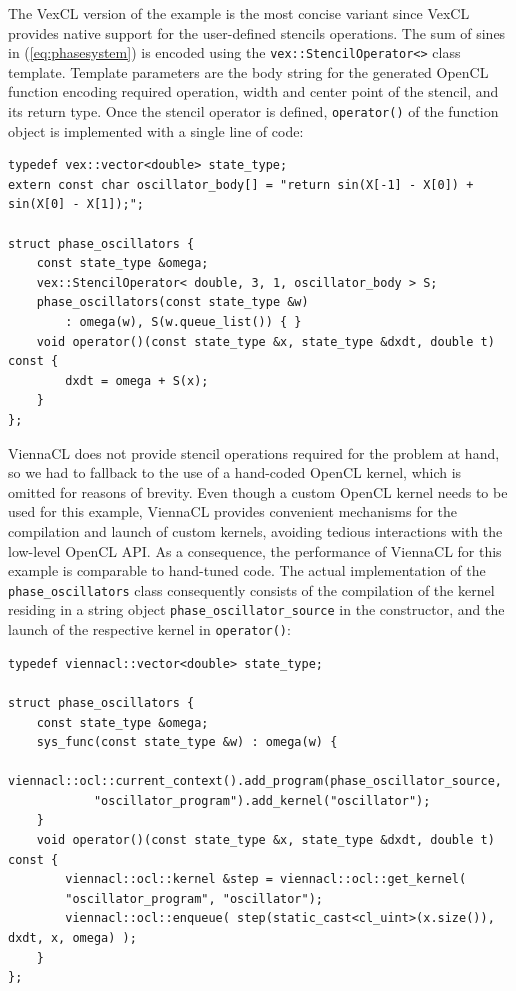 \documentclass[final]{siamltex}
\newcommand{\code}[1]{\lstinline|#1|}
\newcommand{\eqref}[1]{(\ref{#1})}
\begin{document}
The VexCL version of the example is the most
concise variant since VexCL provides native support for the user-defined
stencils operations. The sum of sines in \eqref{eq:phasesystem} is encoded
using the \code{vex::StencilOperator<>} class template. Template parameters
are the body string for the generated OpenCL function encoding required
operation, width and center point of the stencil, and its return type. Once the
stencil operator is defined, \code{operator()} of the function object is implemented
with a single line of code:
\begin{lstlisting}
typedef vex::vector<double> state_type;
extern const char oscillator_body[] = "return sin(X[-1] - X[0]) + sin(X[0] - X[1]);";

struct phase_oscillators {
    const state_type &omega;
    vex::StencilOperator< double, 3, 1, oscillator_body > S;
    phase_oscillators(const state_type &w)
        : omega(w), S(w.queue_list()) { }
    void operator()(const state_type &x, state_type &dxdt, double t) const {
        dxdt = omega + S(x);
    }
};
\end{lstlisting}


ViennaCL does not provide stencil operations required for the problem at hand, so we had
to fallback to the use of a hand-coded OpenCL kernel, which is omitted for
reasons of brevity.  Even though a custom OpenCL kernel needs to be used for
this example, ViennaCL provides convenient mechanisms for the compilation and
launch of custom kernels, avoiding tedious interactions with the low-level
OpenCL API.  As a consequence, the performance of ViennaCL for this example is
comparable to hand-tuned code.  The actual implementation of the
\code{phase_oscillators} class consequently consists of the compilation of the
kernel residing in a string object \code{phase_oscillator_source} in the
constructor, and the launch of the respective kernel in \code{operator()}:
\begin{lstlisting}
typedef viennacl::vector<double> state_type;

struct phase_oscillators {
    const state_type &omega;
    sys_func(const state_type &w) : omega(w) {
        viennacl::ocl::current_context().add_program(phase_oscillator_source,
            "oscillator_program").add_kernel("oscillator");
    }
    void operator()(const state_type &x, state_type &dxdt, double t) const {
        viennacl::ocl::kernel &step = viennacl::ocl::get_kernel(
		"oscillator_program", "oscillator");
        viennacl::ocl::enqueue( step(static_cast<cl_uint>(x.size()), dxdt, x, omega) );
    }
};
\end{lstlisting}
\end{document}
